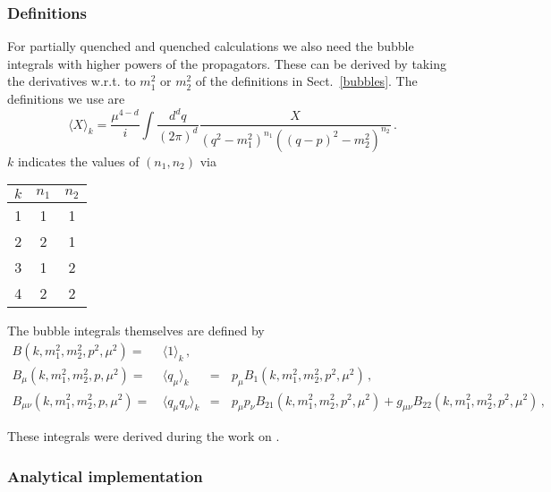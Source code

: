 \documentclass[12pt,a4paper]{article}
\begin{document}
\subsubsection{Definitions}

For partially quenched and quenched calculations we also need
the bubble integrals with higher powers of the propagators.
These can be derived by taking the derivatives w.r.t. to $m_1^2$
or $m_2^2$ of the definitions in Sect.~\ref{bubbles}.
The definitions we use are
\begin{equation}
\label{defBpq}
\langle X \rangle_k = \frac{\mu^{4-d}}{i}\int \frac{d^d q}{(2\pi)^d}
 \frac{X}{\left(q^2-m_1^2\right)^{n_1} \left((q-p)^2-m_2^2\right)^{n_2} }\,.
\end{equation}
$k$ indicates the values of $(n_1,n_2)$
via\\ 
\begin{center}
\begin{tabular}{|ccc|}
\hline
$k$ & $n_1$ & $n_2$ \\
\hline
1 & 1 & 1\\
2 & 2 & 1\\
3 & 1 & 2\\
4 & 2 & 2\\
\hline
\end{tabular}
\end{center}
The bubble integrals themselves are defined by
\begin{align}
\label{defbubblepq}
B(k,m_1^2,m_2^2,p^2,\mu^2) =\, &
\langle 1 \rangle_k\,, &&
\nonumber\\
B_\mu(k,m_1^2,m_2^2,p,\mu^2) =\, &
\langle q_\mu \rangle_k
& = &\,p_\mu B_1(k,m_1^2,m_2^2,p^2,\mu^2)\,,
\nonumber\\
B_{\mu\nu}(k,m_1^2,m_2^2,p,\mu^2) =\, &
\langle q_\mu q_\nu\rangle_k
&=&\, p_\mu p_\nu B_{21}(k,m_1^2,m_2^2,p^2,\mu^2)
+g_{\mu\nu} B_{22}(k,m_1^2,m_2^2,p^2,\mu^2)\,,
\end{align}

These integrals were derived during the work on \cite{Bernard:2013eya}.

\subsubsection{Analytical implementation}
\end{document}
